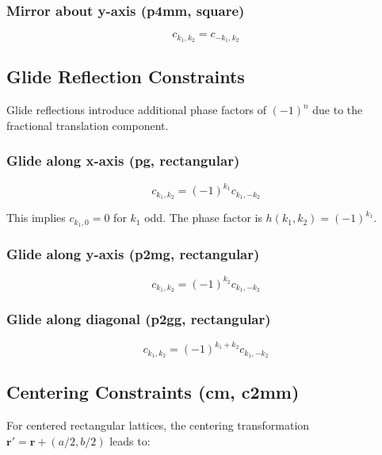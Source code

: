 \subsubsection{Mirror about y-axis (p4mm, square)}

\begin{equation}
    c_{k_1,k_2} = c_{-k_1,k_2}
\end{equation}

\subsection{Glide Reflection Constraints}

Glide reflections introduce additional phase factors of $(-1)^n$ due to the fractional translation component.

\subsubsection{Glide along x-axis (pg, rectangular)}

\begin{equation}
    c_{k_1,k_2} = (-1)^{k_1} c_{k_1,-k_2}
\end{equation}

This implies $c_{k_1,0} = 0$ for $k_1$ odd. The phase factor is $h(k_1,k_2) = (-1)^{k_1}$.

\subsubsection{Glide along y-axis (p2mg, rectangular)}

\begin{equation}
    c_{k_1,k_2} = (-1)^{k_2} c_{k_1,-k_2}
\end{equation}

\subsubsection{Glide along diagonal (p2gg, rectangular)}

\begin{equation}
    c_{k_1,k_2} = (-1)^{k_1+k_2} c_{k_1,-k_2}
\end{equation}

\subsection{Centering Constraints (cm, c2mm)}

For centered rectangular lattices, the centering transformation $\boldsymbol{r}' = \boldsymbol{r} + (a/2, b/2)$ leads to:

